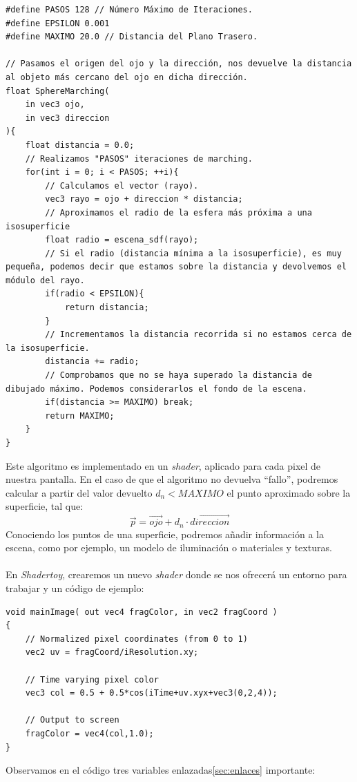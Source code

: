 \newpage
\begin{lstlisting}
#define PASOS 128 // Número Máximo de Iteraciones.
#define EPSILON 0.001
#define MAXIMO 20.0 // Distancia del Plano Trasero.

// Pasamos el origen del ojo y la dirección, nos devuelve la distancia al objeto más cercano del ojo en dicha dirección.
float SphereMarching(
    in vec3 ojo, 
    in vec3 direccion
){
    float distancia = 0.0;
    // Realizamos "PASOS" iteraciones de marching.
    for(int i = 0; i < PASOS; ++i){
        // Calculamos el vector (rayo).
        vec3 rayo = ojo + direccion * distancia;
        // Aproximamos el radio de la esfera más próxima a una isosuperficie
        float radio = escena_sdf(rayo);
        // Si el radio (distancia mínima a la isosuperficie), es muy pequeña, podemos decir que estamos sobre la distancia y devolvemos el módulo del rayo.
        if(radio < EPSILON){
            return distancia;
        }
        // Incrementamos la distancia recorrida si no estamos cerca de la isosuperficie.
        distancia += radio;
        // Comprobamos que no se haya superado la distancia de dibujado máximo. Podemos considerarlos el fondo de la escena.
        if(distancia >= MAXIMO) break;
        return MAXIMO;
    }
}
\end{lstlisting}
\newpage
Este algoritmo es implementado en un \textit{shader}, aplicado para cada pixel de nuestra pantalla. En el caso  de que el algoritmo no devuelva \enquote{fallo}, podremos calcular a partir del valor devuelto \(d_n<MAXIMO\) el punto aproximado sobre la superficie, tal que:
\[ \Vec{p} = \Vec{ojo} + d_n \cdot  \Vec{direccion} \]
Conociendo los puntos de una superficie, podremos añadir información a la escena, como por ejemplo, un modelo de iluminación o materiales y texturas.\\\\
En \textit{Shadertoy}, crearemos un nuevo \textit{shader} donde se nos ofrecerá un entorno para trabajar y un código de ejemplo:
\begin{lstlisting}
void mainImage( out vec4 fragColor, in vec2 fragCoord )
{
    // Normalized pixel coordinates (from 0 to 1)
    vec2 uv = fragCoord/iResolution.xy;

    // Time varying pixel color
    vec3 col = 0.5 + 0.5*cos(iTime+uv.xyx+vec3(0,2,4));

    // Output to screen
    fragColor = vec4(col,1.0);
}
\end{lstlisting}
Observamos en el código tres variables enlazadas\ref{sec:enlaces} importante:

